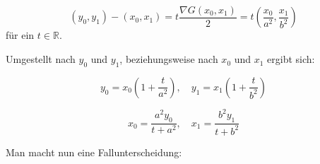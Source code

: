 \begin{equation}
	(y_0,y_1) - (x_0, x_1) = t\frac{\nabla G(x_0,x_1)}{2} = t\left(\frac{x_0}{a^2},\frac{x_1}{b^2}\right)
\end{equation}
für ein $t\in\mathbb{R}$.

Umgestellt nach $y_0$ und $y_1$, beziehungsweise nach $x_0$ und $x_1$ ergibt sich:

\begin{equation}\label{eq:ellipseDistY}
y_0 = x_0\left(1 + \frac{t}{a^2}\right), \quad y_1 = x_1\left(1 + \frac{t}{b^2}\right)
\end{equation}

\begin{equation}\label{eq:ellipseDistX}
x_0 = \frac{a^2y_0}{t+a^2},\quad x_1 = \frac{b^2y_1}{t+b^2}
\end{equation}


\bigskip
Man macht nun eine Fallunterscheidung:

